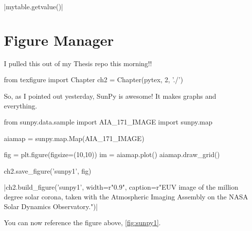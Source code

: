 \documentclass[]{article}
\begin{document}
\py|mytable.getvalue()|


\section{Figure Manager}

I pulled this out of my Thesis repo this morning!!

\begin{pycode}[chapter2]
from texfigure import Chapter
ch2 = Chapter(pytex, 2, './')
\end{pycode}

So, as I pointed out yesterday, SunPy is awesome! It makes graphs and everything.

\begin{pycode}[chapter2]
from sunpy.data.sample import AIA_171_IMAGE
import sunpy.map

aiamap = sunpy.map.Map(AIA_171_IMAGE)

fig = plt.figure(figsize=(10,10))
im = aiamap.plot()
aiamap.draw_grid()


ch2.save_figure('sunpy1', fig)
\end{pycode}

\py[chapter2]|ch2.build_figure('sunpy1',
width=r"0.9\columnwidth",
caption=r"EUV image of the million degree solar corona, taken with the Atmospheric Imaging Assembly on the NASA Solar Dynamics Observatory.")|

You can now reference the figure above, \ref{fig:sunpy1}.
\end{document}
